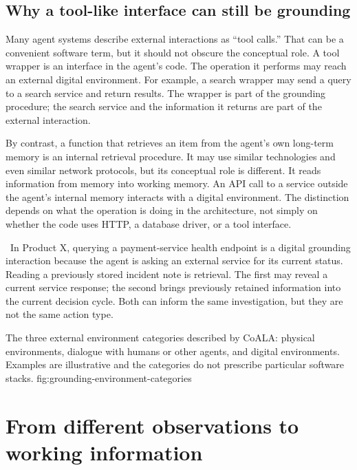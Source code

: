\subsection{Why a tool-like interface can still be grounding}

Many agent systems describe external interactions as ``tool calls.'' That can be a convenient software term, but it should not obscure the conceptual role. A tool wrapper is an interface in the agent's code. The operation it performs may reach an external digital environment. For example, a search wrapper may send a query to a search service and return results. The wrapper is part of the grounding procedure; the search service and the information it returns are part of the external interaction.

By contrast, a function that retrieves an item from the agent's own long-term memory is an internal retrieval procedure. It may use similar technologies and even similar network protocols, but its conceptual role is different. It reads information from memory into working memory. An API call to a service outside the agent's internal memory interacts with a digital environment. The distinction depends on what the operation is doing in the architecture, not simply on whether the code uses HTTP, a database driver, or a tool interface.

\BookExampleLabel\ In Product X, querying a payment-service health endpoint is a digital grounding interaction because the agent is asking an external service for its current status. Reading a previously stored incident note is retrieval. The first may reveal a current service response; the second brings previously retained information into the current decision cycle. Both can inform the same investigation, but they are not the same action type.

  {The three external environment categories described by CoALA: physical environments, dialogue with humans or other agents, and digital environments. Examples are illustrative and the categories do not prescribe particular software stacks.}
  {fig:grounding-environment-categories}

\section{From different observations to working information}
\label{sec:grounding-observation-representation}

